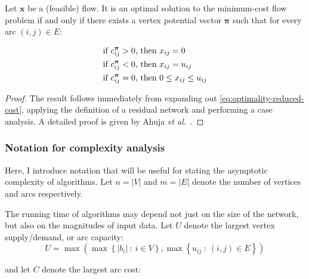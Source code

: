 \begin{thm} \label{thm:optimality-complementary-slackness}
Let $\mathbf{x}$ be a (feasible) flow. It is an optimal solution to the minimum-cost flow problem if and only if there exists a vertex potential vector $\boldsymbol{\pi}$ such that for every arc $(i,j)\in E$:

\normalfont %
\begin{subequations} \label{eq:optimality-complementary-slackness}
\begin{align} 
\text{if \ensuremath{c_{ij}^{\boldsymbol{\pi}}>0}, } & \text{then \ensuremath{x_{ij}=0}} \\
\text{if \ensuremath{c_{ij}^{\boldsymbol{\pi}}<0}, } & \text{then \ensuremath{x_{ij}=u_{ij}}} \\
\text{if \ensuremath{c_{ij}^{\boldsymbol{\pi}}=0}, } & \text{then \ensuremath{0\leq x_{ij}\leq  u_{ij}}}
\end{align}
\end{subequations}
\end{thm}
\begin{proof}
The result follows immediately from expanding out \cref{eq:optimality-reduced-cost}, applying the definition of a residual network and performing a case analysis. A detailed proof is given by Ahuja \textit{et al.}~\cite[p.~310]{Ahuja:1993}.
\end{proof}

\subsubsection{Notation for complexity analysis} \label{sec:prep-flow-complexity}


Here, I introduce notation that will be useful for stating the asymptotic complexity of algorithms. Let $n=|V|$ and $m=|E|$ denote the number of vertices and arcs respectively.

The running time of algorithms may depend not just on the size of the network, but also on the magnitudes of input data. Let $U$ denote the largest vertex supply/demand, or arc capacity:
\begin{equation}
U=\max\left(\max\left\{ |b_{i}|\::\: i\in V\right\} ,\max\left\{ u_{ij}\::\:\left(i,j\right)\in E\right\} \right)
\end{equation}

and let $C$ denote the largest arc cost:

